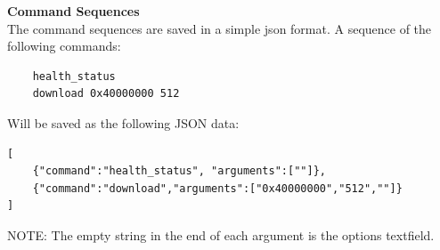 \textbf{Command Sequences} \\
The command sequences are saved in a simple json format. A sequence of the following commands:
\begin{verbatim}
	health_status
	download 0x40000000 512
\end{verbatim}
Will be saved as the following JSON data:
\begin{verbatim}
[
	{"command":"health_status", "arguments":[""]},
	{"command":"download","arguments":["0x40000000","512",""]}
]
\end{verbatim}
NOTE: The empty string in the end of each argument is the options textfield.
